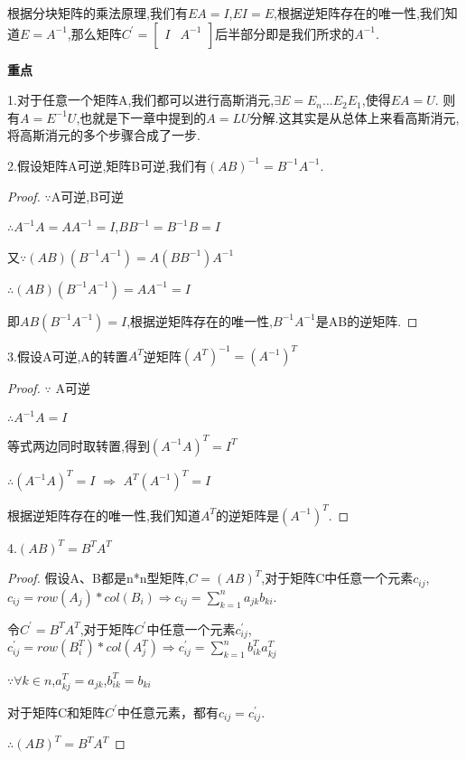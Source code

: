 \documentclass[oneside]{book}
\begin{document}
	根据分块矩阵的乘法原理,我们有$ EA=I $,$ EI=E $,根据逆矩阵存在的唯一性,我们知道$ E=A^{-1} $,那么矩阵$ C^{'}= \left[ \begin{array}{cc}
		I & A^{-1} \\
	\end{array} \right] $后半部分即是我们所求的$ A^{-1} $.

	\textbf{重点}
	
	1.对于任意一个矩阵A,我们都可以进行高斯消元,$ \exists E=E_{n}...E_{2}E_{1} $,使得$ EA=U $.
	则有$ A=E^{-1}U $,也就是下一章中提到的$ A=LU $分解.这其实是从总体上来看高斯消元,将高斯消元的多个步骤合成了一步.
	
	2.假设矩阵A可逆,矩阵B可逆,我们有$ (AB)^{-1}=B^{-1}A^{-1} $.
	\begin{proof}
		$ \because $A可逆,B可逆
		
		$ \therefore A^{-1}A=AA^{-1}=I $,$ BB^{-1}=B^{-1}B=I $
		
		又$\because (AB)(B^{-1}A^{-1})=A(BB^{-1})A^{-1} $
		
		$ \therefore (AB)(B^{-1}A^{-1})=AA^{-1}=I $
		
		即$ AB(B^{-1}A^{-1})=I $,根据逆矩阵存在的唯一性,$ B^{-1}A^{-1} $是AB的逆矩阵.
	\end{proof}
	3.假设A可逆,A的转置$ A^{T}$逆矩阵$ (A^{T})^{-1}=(A^{-1})^{T} $
	\begin{proof}
		$ \because $ A可逆
		
		$\therefore A^{-1}A=I$
		
		等式两边同时取转置,得到$(A^{-1}A)^{T}=I^{T}$
		
		$ \therefore (A^{-1}A)^{T}=I$ $\Rightarrow$ $A^{T}(A^{-1})^{T}=I$
		
		根据逆矩阵存在的唯一性,我们知道$ A^{T} $的逆矩阵是$ (A^{-1})^{T} $.          
	\end{proof}
	4.$ (AB)^{T}=B^{T}A^{T} $
	\begin{proof}
		假设A、B都是n*n型矩阵,$ C=(AB)^{T} $,对于矩阵C中任意一个元素$ c_{ij} $,$ c_{ij}=row(A_{j})*col(B_{i}) \Rightarrow c_{ij}=\sum_{k=1}^{n}a_{jk}b_{ki} $.
		
		令$ C^{'}=B^{T}A^{T} $,对于矩阵$ C^{'} $中任意一个元素$ c_{ij}^{'} $,$c_{ij}^{'}=row(B_{i}^{T})*col(A_{j}^{T}) \Rightarrow c_{ij}^{'}=\sum_{k=1}^{n}b_{ik}^{T}a_{kj}^{T} $
		
		$\because \forall k\in n  $,$ a_{kj}^{T}=a_{jk} $,$ b_{ik}^{T}=b_{ki} $
	
	 	对于矩阵C和矩阵$ C^{'} $中任意元素，都有$ c_{ij}=c_{ij}^{'} $.
	 	
	 	$\therefore (AB)^{T}=B^{T}A^{T}$
	\end{proof}
\end{document}
